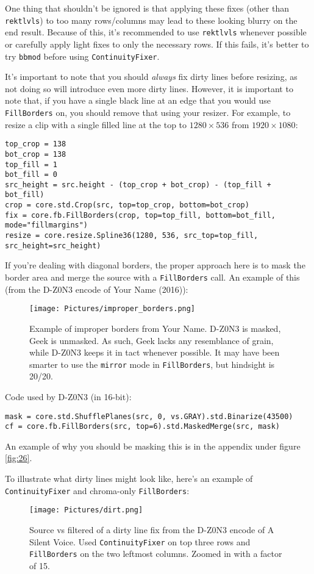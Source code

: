 \documentclass{scrartcl}
\begin{document}
One thing that shouldn't be ignored is that applying these fixes (other than \texttt{rektlvls}) to too many rows/columns may lead to these looking blurry on the end result.  Because of this, it's recommended to use \texttt{rektlvls} whenever possible or carefully apply light fixes to only the necessary rows.  If this fails, it's better to try \texttt{bbmod} before using \texttt{ContinuityFixer}.

It's important to note that you should \textit{always} fix dirty lines before resizing, as not doing so will introduce even more dirty lines.  However, it is important to note that, if you have a single black line at an edge that you would use \texttt{FillBorders} on, you should remove that using your resizer.  For example, to resize a clip with a single filled line at the top to $1280\times536$ from $1920\times1080$:
\begin{lstlisting}
top_crop = 138
bot_crop = 138
top_fill = 1
bot_fill = 0
src_height = src.height - (top_crop + bot_crop) - (top_fill + bot_fill)
crop = core.std.Crop(src, top=top_crop, bottom=bot_crop)
fix = core.fb.FillBorders(crop, top=top_fill, bottom=bot_fill, mode="fillmargins")
resize = core.resize.Spline36(1280, 536, src_top=top_fill, src_height=src_height)
\end{lstlisting}

If you're dealing with diagonal borders, the proper approach here is to mask the border area and merge the source with a \texttt{FillBorders} call.  An example of this (from the D-Z0N3 encode of Your Name (2016)):

\begin{figure}[h]
\centering
\texttt{[image: Pictures/improper\_borders.png]}
\caption{Example of improper borders from Your Name.  D-Z0N3 is masked, Geek is unmasked.  As such, Geek lacks any resemblance of grain, while D-Z0N3 keeps it in tact whenever possible.  It may have been smarter to use the \texttt{mirror} mode in \texttt{FillBorders}, but hindsight is 20/20.}\label{fig:25}
\end{figure}
Code used by D-Z0N3 (in 16-bit):
\begin{lstlisting}
mask = core.std.ShufflePlanes(src, 0, vs.GRAY).std.Binarize(43500)
cf = core.fb.FillBorders(src, top=6).std.MaskedMerge(src, mask)
\end{lstlisting}
An example of why you should be masking this is in the appendix under figure \ref{fig:26}.

To illustrate what dirty lines might look like, here's an example of \texttt{ContinuityFixer} and chroma-only \texttt{FillBorders}:
\begin{figure}[h]
\centering
\texttt{[image: Pictures/dirt.png]}
\caption{Source vs filtered of a dirty line fix from the D-Z0N3 encode of A Silent Voice.  Used \texttt{ContinuityFixer} on top three rows and \texttt{FillBorders} on the two leftmost columns.  Zoomed in with a factor of 15.}\label{fig:4}
\end{figure}
\end{document}
